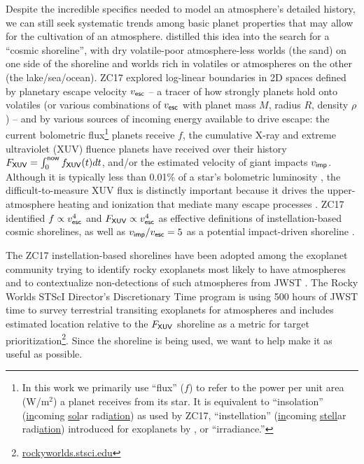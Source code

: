 \documentclass[modern,linenumbers,trackchanges]{aastex7}
\begin{document}
Despite the incredible specifics needed to model an atmosphere's detailed history, we can still seek systematic trends among basic planet properties that may allow for the cultivation of an atmosphere. \citet[][hereafter ZC17]{zahnleCosmicShorelineEvidence2017a} distilled this idea into the search for a ``cosmic shoreline'', with dry volatile-poor atmosphere-less worlds (the sand) on one side of the shoreline and worlds rich in volatiles or atmospheres on the other (the lake/sea/ocean). ZC17 explored log-linear boundaries in 2D spaces defined by planetary escape velocity $v_{\sf esc}$ -- a tracer of how strongly planets hold onto volatiles (or various combinations of $v_{\sf esc}$ with planet mass $M$, radius $R$, density $\rho$) -- and by various sources of incoming energy available to drive escape: the current bolometric flux\footnote{In this work we primarily use ``flux'' ($f$) to refer to the power per unit area (W/m$^2$) a planet receives from its star. It is equivalent to ``insolation'' (\underline{in}coming \underline{sol}ar radi\underline{ation}) as used by ZC17, ``instellation'' (\underline{in}coming \underline{stell}ar radi\underline{ation}) introduced for exoplanets by \citet{shieldsEffectHostStar2013}, or ``irradiance.''}
planets receive $f$, the cumulative X-ray and extreme ultraviolet (XUV) fluence planets have received over their history $F_{\sf XUV} = \int_{0}^{\sf now}f_{\sf XUV}(t) dt$, and/or the estimated velocity of giant impacts $v_{\sf imp}$. Although it is typically less than 0.01\% of a star's bolometric luminosity \citep{franceMUSCLESTreasurySurvey2016}, the difficult-to-measure XUV flux is distinctly important because it drives the upper-atmosphere heating and ionization that mediate many escape processes \citep{linskyInferringIntrinsicStellar2024}. ZC17 identified $f \propto v_{\sf esc}^4$ and $F_{\sf XUV} \propto v_{\sf esc}^4$ as effective definitions of instellation-based cosmic shorelines, as well as $v_{\sf imp}/v_{\sf esc} = 5$ as a potential impact-driven shoreline \citep[see also][]{zahnleOriginsAtmospheres1998}.

The ZC17 instellation-based shorelines have been adopted among the exoplanet community trying to identify rocky exoplanets most likely to have atmospheres and to contextualize non-detections of such atmospheres from JWST \citep[][and references therein]{parkcoyPopulationlevelHypothesisTesting2024}. The Rocky Worlds STScI Director's Discretionary Time program is using 500 hours of JWST time to survey terrestrial transiting exoplanets for atmospheres \citep{redfieldReportWorkingGroup2024} and includes estimated location relative to the $F_{\sf XUV}$ shoreline as a metric for target prioritization\footnote{\href{https://rockyworlds.stsci.edu/}{rockyworlds.stsci.edu}}. Since the shoreline is being used, we want to help make it as useful as possible. 
\end{document}
